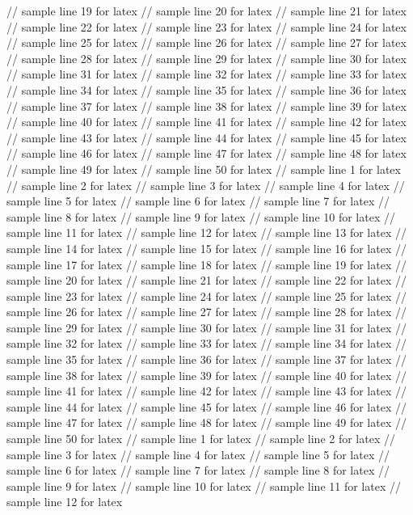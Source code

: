 // sample line 19 for latex
// sample line 20 for latex
// sample line 21 for latex
// sample line 22 for latex
// sample line 23 for latex
// sample line 24 for latex
// sample line 25 for latex
// sample line 26 for latex
// sample line 27 for latex
// sample line 28 for latex
// sample line 29 for latex
// sample line 30 for latex
// sample line 31 for latex
// sample line 32 for latex
// sample line 33 for latex
// sample line 34 for latex
// sample line 35 for latex
// sample line 36 for latex
// sample line 37 for latex
// sample line 38 for latex
// sample line 39 for latex
// sample line 40 for latex
// sample line 41 for latex
// sample line 42 for latex
// sample line 43 for latex
// sample line 44 for latex
// sample line 45 for latex
// sample line 46 for latex
// sample line 47 for latex
// sample line 48 for latex
// sample line 49 for latex
// sample line 50 for latex
// sample line 1 for latex
// sample line 2 for latex
// sample line 3 for latex
// sample line 4 for latex
// sample line 5 for latex
// sample line 6 for latex
// sample line 7 for latex
// sample line 8 for latex
// sample line 9 for latex
// sample line 10 for latex
// sample line 11 for latex
// sample line 12 for latex
// sample line 13 for latex
// sample line 14 for latex
// sample line 15 for latex
// sample line 16 for latex
// sample line 17 for latex
// sample line 18 for latex
// sample line 19 for latex
// sample line 20 for latex
// sample line 21 for latex
// sample line 22 for latex
// sample line 23 for latex
// sample line 24 for latex
// sample line 25 for latex
// sample line 26 for latex
// sample line 27 for latex
// sample line 28 for latex
// sample line 29 for latex
// sample line 30 for latex
// sample line 31 for latex
// sample line 32 for latex
// sample line 33 for latex
// sample line 34 for latex
// sample line 35 for latex
// sample line 36 for latex
// sample line 37 for latex
// sample line 38 for latex
// sample line 39 for latex
// sample line 40 for latex
// sample line 41 for latex
// sample line 42 for latex
// sample line 43 for latex
// sample line 44 for latex
// sample line 45 for latex
// sample line 46 for latex
// sample line 47 for latex
// sample line 48 for latex
// sample line 49 for latex
// sample line 50 for latex
// sample line 1 for latex
// sample line 2 for latex
// sample line 3 for latex
// sample line 4 for latex
// sample line 5 for latex
// sample line 6 for latex
// sample line 7 for latex
// sample line 8 for latex
// sample line 9 for latex
// sample line 10 for latex
// sample line 11 for latex
// sample line 12 for latex
